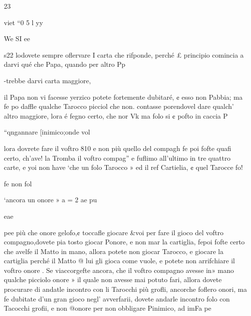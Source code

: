 \documentclass[12pt,a6paper]{article}
\begin{document}
   

23

  
      
  

 
 

 

 

 

 

viet
“0 5 l
yy

 

 

 

We SI ee

s22
lodovete sempre oflervare I
carta che rifponde, perché £
principio comincia a darvi qué
che Papa, quando per altro Pp

-trebbe darvi carta maggiore,

il Papa non vi facesse yerzico
potete fortemente dubitaré, ¢
esso non Pabbia; ma fe po%
daffle qualche Tarocco picciol
che non. contasse porendovel
dare qualch’ altro maggiore,
lora é fegno certo, che nor Vk
ma folo si ¢ pofto in caccia P

“qngannare [inimico;onde vol

lora dovrete fare il voftro 810
e non più quello del compagh
fe poi fofte quafi certo, ch’ave!
la Tromba il voftro compag”
e fuflimo all’ultimo in tre
quattro carte, e yoi non have
‘che un folo Tarocco » ed il ref
Cartielia, ¢ quel Tarocce fo!

fe non fol

‘ancora un onore » a
= 2 ae pu

eae
  
  

pee
più che onore gelofo,¢ toccafle
giocare &voi per fare il gioco
del voftro compagno,dovete pia
tosto giocar Ponore, e non mar
la cartiglia, fepoi fofte certo
che avelfe il Matto in mano, allora potete non giocar Tarocco,
e giocare la cartiglia perché
il Matto @ lui gli gioca come
vuole, e potete non arrifchiare
il voftro onore .
Se viaccorgefte ancora, che
il voftro compagno avesse in»
mano qualche picciolo onore »
il quale non avesse mai potuto
fari, allora dovete procurare di
andatle incontro con li Tarocchi più grofli, ancorche foflero
onori, ma fe dubitate d'un gran
gioco negl’ avverfarii, dovete
andarle incontro folo con Tacocchi grofii, e non @onore per
non obbligare Pinimico, ad imFa pe

 

 

 
 

 
\end{document}
